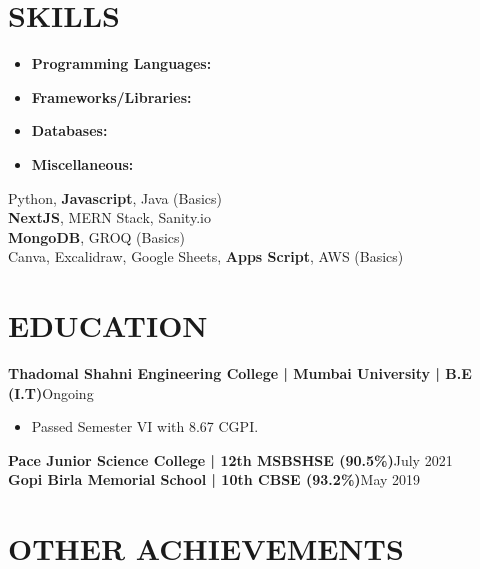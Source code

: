 \documentclass[a4paper,11pt]{article}
\newcommand{\entry}[2]{
  \noindent\textbf{#1}\hfill{#2}\\[-1em]
}
\newenvironment{itemizeWithPadding}{
  \begin{itemize}
}{
  \end{itemize}
  \vspace{0.5em} %
}
\begin{document}
\section*{SKILLS}
\vspace{-1.25em}
\begin{minipage}{0.3\textwidth}
    \begin{itemize}
        \item \textbf{Programming Languages:}
        \item \textbf{Frameworks/Libraries:}
        \item \textbf{Databases:}
        \item \textbf{Miscellaneous:}
    \end{itemize}
\end{minipage}
\begin{minipage}{0.7\textwidth}
    \vspace{1.75em}
    \setlength{\baselineskip}{1.2\baselineskip}  %
     Python, \textbf{Javascript}, Java (Basics)\\
     \textbf{NextJS}, MERN Stack, Sanity.io\\
     \textbf{MongoDB}, GROQ (Basics)\\
     Canva, Excalidraw, Google Sheets, \textbf{Apps Script}, AWS (Basics)\\    
\end{minipage}
\vspace{-2em}

\section*{EDUCATION}

\entry{Thadomal Shahni Engineering College | Mumbai University | B.E (I.T)}{Ongoing}
\begin{itemizeWithPadding}
  \item Passed Semester VI with 8.67 CGPI.
\end{itemizeWithPadding}

\entry{Pace Junior Science College | 12th MSBSHSE (90.5\%)}{July 2021}

\entry{Gopi Birla Memorial School | 10th CBSE (93.2\%)}{May 2019}

\section*{OTHER ACHIEVEMENTS}
\end{document}
